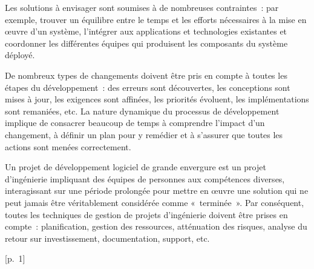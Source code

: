 {{\item Les solutions à envisager sont soumises à de nombreuses contraintes~: par exemple, trouver un équilibre entre le temps et les efforts nécessaires à la mise en œuvre d'un système, l'intégrer aux applications et technologies existantes et coordonner les différentes équipes qui produisent les composants du système déployé.
\item De nombreux types de changements doivent être pris en compte à toutes les étapes du développement~: des erreurs sont découvertes, les conceptions sont mises à jour, les exigences sont affinées, les priorités évoluent, les implémentations sont remaniées, etc. La nature dynamique du processus de développement implique de consacrer beaucoup de temps à comprendre l'impact d'un changement, à définir un plan pour y remédier et à s'assurer que toutes les actions sont menées correctement.
\item Un projet de développement logiciel de grande envergure est un projet d'ingénierie impliquant des équipes de personnes aux compétences diverses, interagissant sur une période prolongée pour mettre en œuvre une solution qui ne peut jamais être véritablement considérée comme «~terminée~». Par conséquent, toutes les techniques de gestion de projets d'ingénierie doivent être prises en compte~: planification, gestion des ressources, atténuation des risques, analyse du retour sur investissement, documentation, support, etc.
}
{[p.~1]}

}{}



